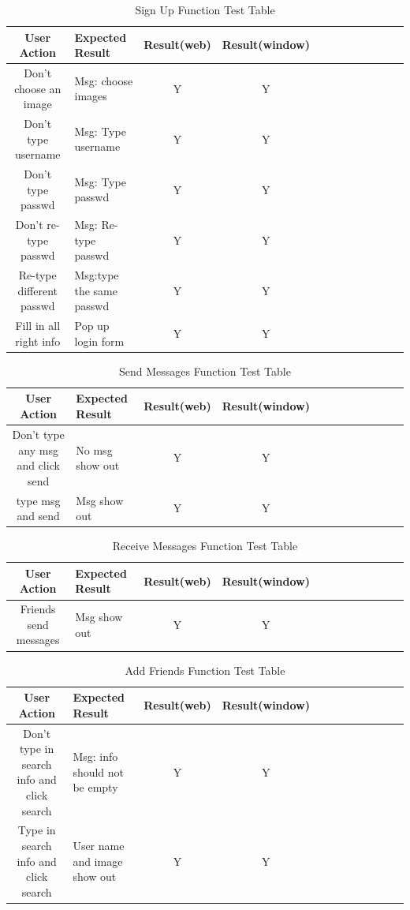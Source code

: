\documentclass[a4paper,11pt]{article}
\begin{document}
\begin{table}[h!]
\centering
\small
  \caption{Sign Up Function Test Table}
\begin{tabular}{|c|l|c|c|c|c|c|c|c|c|c|c|}
 \hline
  \label{tab:table1}
    User Action & Expected Result & Result(web) & Result(window)\\ 
    \hline
   Don’t choose an image  & Msg: choose images & Y & Y\\ \hline
 
       Don’t type username & Msg: Type username & Y & Y\\ \hline
      Don't type passwd & Msg: Type passwd  & Y & Y\\ \hline
        Don't re-type passwd & Msg: Re-type passwd & Y & Y\\ \hline
        Re-type different passwd & Msg:type the same passwd & Y & Y \\ \hline
       Fill in all right info & Pop up login form & Y & Y \\ \hline
  \end{tabular}
\end{table}

\begin{table}[h!]
\centering
\small
  \caption{Send Messages Function Test Table}
\begin{tabular}{|c|l|c|c|c|c|c|c|c|c|c|c|}
 \hline
  \label{tab:table1}
      User Action & Expected Result & Result(web) & Result(window)\\ 
    \hline
   Don’t type any msg and click send  & No msg show out & Y & Y\\ \hline
 
    type msg and send & Msg show out & Y & Y\\ \hline
    
  \end{tabular}
\end{table}

\begin{table}[h!]
\centering
\small
  \caption{Receive Messages Function Test Table}
\begin{tabular}{|c|l|c|c|c|c|c|c|c|c|c|c|}
 \hline
  \label{tab:table1}
      User Action & Expected Result & Result(web) & Result(window)\\ 
    \hline
  Friends send messages  & Msg show out & Y & Y\\ \hline
  \end{tabular}
\end{table}

\begin{table}[h!]
\centering
\small
  \caption{Add Friends Function Test Table}
\begin{tabular}{|c|l|c|c|c|c|c|c|c|c|c|c|}
 \hline
  \label{tab:table1}
      User Action & Expected Result & Result(web) & Result(window)\\ 
    \hline
   Don’t type in search info and click search  & Msg: info should not be empty & Y & Y\\ \hline
    Type in search info and click search & User name and image show out & Y & Y\\ \hline
  \end{tabular}
\end{table}
\end{document}
